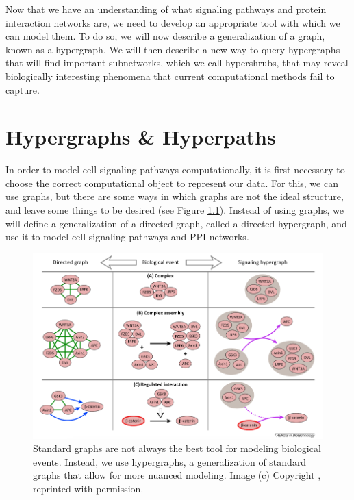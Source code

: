 \documentclass[12pt,twoside]{reedthesis}
\theoremstyle{definition}
\begin{document}
Now that we have an understanding of what signaling pathways and protein interaction networks are, we need to develop an appropriate tool with which we can model them. To do so, we will now describe a generalization of a graph, known as a hypergraph. We will then describe a new way to query hypergraphs that will find important subnetworks, which we call hypershrubs, that may reveal biologically interesting phenomena that current computational methods fail to capture.\par

\chapter{Hypergraphs \& Hyperpaths}

In order to model cell signaling pathways computationally, it is first necessary to choose the correct computational object to represent our data. For this, we can use graphs, but there are some ways in which graphs are not the ideal structure, and leave some things to be desired (see Figure \ref{fig:anna_fig}). Instead of using graphs, we will define a generalization of a directed graph, called a directed hypergraph, and use it to model cell signaling pathways and PPI networks.

\begin{figure}[h]
  \begin{center}
    \includegraphics[width=\textwidth]{anna_fig}
  \caption[The issue with standard graphs.]{Standard graphs are not always the best tool for modeling biological events. Instead, we use hypergraphs, a generalization of standard graphs that allow for more nuanced modeling. Image (c) Copyright \cite{Ritz2014a}, reprinted with permission.}
  \label{fig:anna_fig}
  \end{center}
\end{figure}
\end{document}
